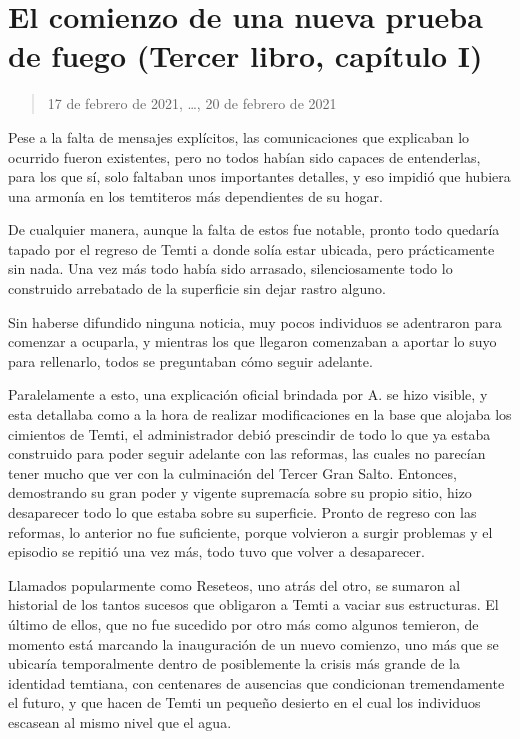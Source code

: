 \documentclass[
]{book}
\begin{document}
\hypertarget{el-comienzo-de-una-nueva-prueba-de-fuego-tercer-libro-capuxedtulo-i}{%
\section{El comienzo de una nueva prueba de fuego (Tercer libro, capítulo I)}\label{el-comienzo-de-una-nueva-prueba-de-fuego-tercer-libro-capuxedtulo-i}}

\begin{quote}
17 de febrero de 2021, \ldots, 20 de febrero de 2021
\end{quote}

Pese a la falta de mensajes explícitos, las comunicaciones que explicaban lo ocurrido fueron existentes, pero no todos habían sido capaces de entenderlas, para los que sí, solo faltaban unos importantes detalles, y eso impidió que hubiera una armonía en los temtiteros más dependientes de su hogar.

De cualquier manera, aunque la falta de estos fue notable, pronto todo quedaría tapado por el regreso de Temti a donde solía estar ubicada, pero prácticamente sin nada. Una vez más todo había sido arrasado, silenciosamente todo lo construido arrebatado de la superficie sin dejar rastro alguno.

Sin haberse difundido ninguna noticia, muy pocos individuos se adentraron para comenzar a ocuparla, y mientras los que llegaron comenzaban a aportar lo suyo para rellenarlo, todos se preguntaban cómo seguir adelante.

Paralelamente a esto, una explicación oficial brindada por A. se hizo visible, y esta detallaba como a la hora de realizar modificaciones en la base que alojaba los cimientos de Temti, el administrador debió prescindir de todo lo que ya estaba construido para poder seguir adelante con las reformas, las cuales no parecían tener mucho que ver con la culminación del Tercer Gran Salto. Entonces, demostrando su gran poder y vigente supremacía sobre su propio sitio, hizo desaparecer todo lo que estaba sobre su superficie. Pronto de regreso con las reformas, lo anterior no fue suficiente, porque volvieron a surgir problemas y el episodio se repitió una vez más, todo tuvo que volver a desaparecer.

Llamados popularmente como Reseteos, uno atrás del otro, se sumaron al historial de los tantos sucesos que obligaron a Temti a vaciar sus estructuras. El último de ellos, que no fue sucedido por otro más como algunos temieron, de momento está marcando la inauguración de un nuevo comienzo, uno más que se ubicaría temporalmente dentro de posiblemente la crisis más grande de la identidad temtiana, con centenares de ausencias que condicionan tremendamente el futuro, y que hacen de Temti un pequeño desierto en el cual los individuos escasean al mismo nivel que el agua.
\end{document}
